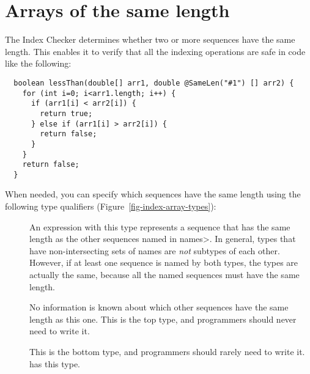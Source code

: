 \section{Arrays of the same length\label{index-samelen}}

The Index Checker determines whether two or more sequences have the same length.
This enables it to verify that all the indexing operations are safe in code
like the following:

\begin{Verbatim}
  boolean lessThan(double[] arr1, double @SameLen("#1") [] arr2) {
    for (int i=0; i<arr1.length; i++) {
      if (arr1[i] < arr2[i]) {
        return true;
      } else if (arr1[i] > arr2[i]) {
        return false;
      }
    }
    return false;
  }
\end{Verbatim}

When needed, you can specify which sequences have the same length using the following type qualifiers (Figure~\ref{fig-index-array-types}):

\begin{description}
\item[]
  An expression with this type represents a sequence that has the
  same length as the other sequences named in \<names>. In general,
   types that have non-intersecting sets of names
  are \textit{not} subtypes of each other. However, if at least one
  sequence is named by both types, the types are actually the same,
  because all the named sequences must have the same length.
\item[]
  No information is known about which other sequences have the same length
  as this one.
  This is the top type, and programmers should never need to write it.
\item[]
  This is the bottom type, and programmers should rarely need to write it.
   has this type.
  \end{description}

